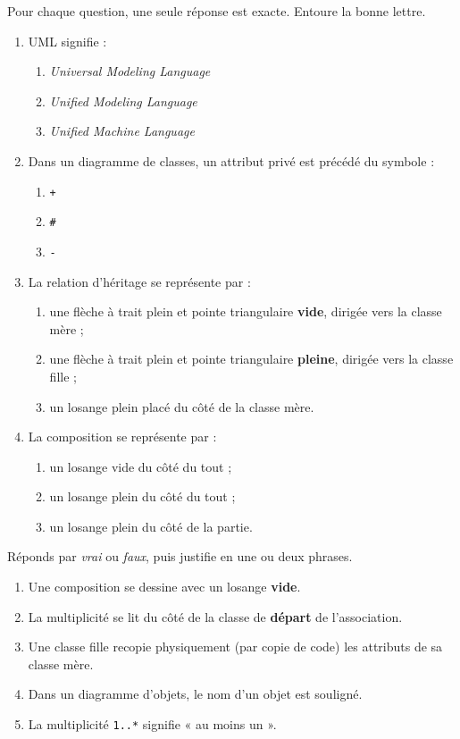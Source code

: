 \documentclass[11pt]{article}
\begin{document}
\begin{exercice}
Pour chaque question, une seule réponse est exacte. Entoure la bonne lettre.
\begin{enumerate}
  \item UML signifie :
  \begin{enumerate}
    \item \emph{Universal Modeling Language}
    \item \emph{Unified Modeling Language}
    \item \emph{Unified Machine Language}
  \end{enumerate}
  \item Dans un diagramme de classes, un attribut privé est précédé du symbole :
  \begin{enumerate}
    \item \texttt{+}
    \item \texttt{\#}
    \item \texttt{-}
  \end{enumerate}
  \item La relation d'héritage se représente par :
  \begin{enumerate}
    \item une flèche à trait plein et pointe triangulaire \textbf{vide}, dirigée vers la classe mère ;
    \item une flèche à trait plein et pointe triangulaire \textbf{pleine}, dirigée vers la classe fille ;
    \item un losange plein placé du côté de la classe mère.
  \end{enumerate}
  \item La composition se représente par :
  \begin{enumerate}
    \item un losange vide du côté du tout ;
    \item un losange plein du côté du tout ;
    \item un losange plein du côté de la partie.
  \end{enumerate}
\end{enumerate}
\end{exercice}

\begin{exercice}
Réponds par \emph{vrai} ou \emph{faux}, puis justifie en une ou deux phrases.
\begin{enumerate}
  \item Une composition se dessine avec un losange \textbf{vide}.
  \item La multiplicité se lit du côté de la classe de \textbf{départ} de l'association.
  \item Une classe fille recopie physiquement (par copie de code) les attributs de sa classe mère.
  \item Dans un diagramme d'objets, le nom d'un objet est souligné.
  \item La multiplicité \texttt{1..*} signifie « au moins un ».
\end{enumerate}
\end{exercice}
\end{document}
